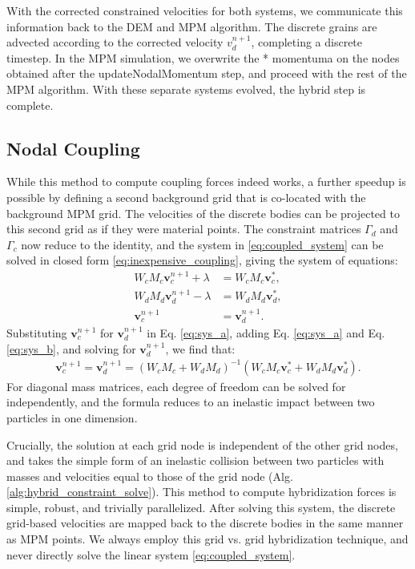 With the corrected constrained velocities for both systems, we communicate this information back to the DEM and MPM algorithm. The discrete grains are advected according to the corrected velocity $v^{n+1}_d$, completing a discrete timestep. In the MPM simulation, we overwrite the * momentuma on the nodes obtained after the updateNodalMomentum step, and proceed with the rest of the MPM algorithm. With these separate systems evolved, the hybrid step is complete.

\subsection{Nodal Coupling}
While this method to compute coupling forces indeed works, a further speedup is possible by defining a second background
grid that is co-located with the background MPM grid. The velocities of the discrete bodies can be projected to this
second grid as if they were material points. The constraint matrices $\Gamma_d$ and $\Gamma_c$ now reduce to the
identity, and the system in \eqref{eq:coupled_system} can be solved in closed form \eqref{eq:inexpensive_coupling}, giving the system of equations:
\begin{align}
W_c M_c \bm{v}_c^{n+1} + \lambda &= W_c M_c \bm{v}^*_c , \label{eq:sys_a} \\
W_d M_d \bm{v}_d^{n+1} - \lambda &= W_d M_d \bm{v}^*_d , \label{eq:sys_b} \\
\bm{v}_c^{n+1} &= \bm{v}_d^{n+1} . \label{eq:sys_c}
\end{align}
Substituting $\bm{v}_c^{n+1}$ for $\bm{v}_d^{n+1}$ in Eq. \eqref{eq:sys_a}, adding Eq. \eqref{eq:sys_a} and Eq. \eqref{eq:sys_b},
and solving for $\bm{v}_d^{n+1}$, we find that:
\begin{align}
\label{eq:inexpensive_coupling}
\bm{v}_c^{n+1} = \bm{v}_d^{n+1} = \left( W_c M_c + W_d M_d \right)^{-1} \left( W_c M_c \bm{v}_c^* + W_d M_d \bm{v}_d^* \right) .
\end{align}
For diagonal mass matrices, each degree of freedom can be solved for independently, and the formula reduces to an
inelastic impact between two particles in one dimension.

Crucially, the solution at each grid
node is independent of the other grid nodes, and takes the simple form of an inelastic collision between two particles
with masses and velocities equal to those of the grid node (Alg. \ref{alg:hybrid_constraint_solve}). This method to compute hybridization forces is simple, robust, and
trivially parallelized. After solving this system, the discrete grid-based velocities are mapped back to the discrete
bodies in the same manner as MPM points. We always employ this grid vs. grid hybridization technique, and never directly solve the linear system \eqref{eq:coupled_system}.

